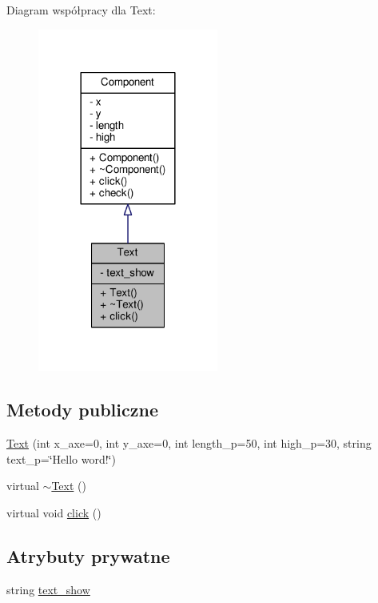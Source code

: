 Diagram współpracy dla Text\+:\nopagebreak
\begin{figure}[H]
\begin{center}
\leavevmode
\includegraphics[width=168pt]{classText__coll__graph}
\end{center}
\end{figure}
\subsection*{Metody publiczne}
\begin{DoxyCompactItemize}
\item 
\hyperlink{classText_a144848b3b22ea514fe2f9c61762af5c3}{Text} (int x\+\_\+axe=0, int y\+\_\+axe=0, int length\+\_\+p=50, int high\+\_\+p=30, string text\+\_\+p=\char`\"{}Hello word!\char`\"{})
\item 
virtual \hyperlink{classText_a068e9e04751fc94f4c45c6cb15af55f4}{$\sim$\+Text} ()
\item 
virtual void \hyperlink{classText_ab334ff82f41302f83bebf3eaf2516a84}{click} ()
\end{DoxyCompactItemize}
\subsection*{Atrybuty prywatne}
\begin{DoxyCompactItemize}
\item 
string \hyperlink{classText_a3fd84b688c6971ba8626b910f0bc2ce3}{text\+\_\+show}
\end{DoxyCompactItemize}


